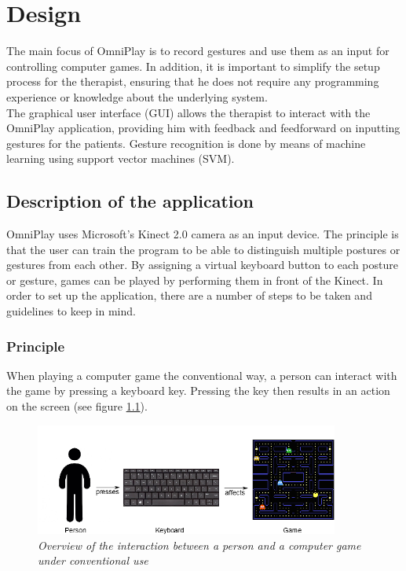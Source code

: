 \chapter{Design}
\label{chapter: design}

The main focus of OmniPlay is to record gestures and use them as an input for controlling computer games. In addition, it is important to simplify the setup process for the therapist, ensuring that he does not require any programming experience or knowledge about the underlying system.\\

The graphical user interface (GUI) allows the therapist to interact with the OmniPlay application, providing him with feedback and feedforward on inputting gestures for the patients. Gesture recognition is done by means of machine learning using support vector machines (SVM).


\section{Description of the application}

OmniPlay uses Microsoft's Kinect 2.0 camera as an input device. The principle is that the user can train the program to be able to distinguish multiple postures or gestures from each other. By assigning a virtual keyboard button to each posture or gesture, games can be played by performing them in front of the Kinect. In order to set up the application, there are a number of steps to be taken and guidelines to keep in mind.


\subsection{Principle}

When playing a computer game the conventional way, a person can interact with the game by pressing a keyboard key. Pressing the key then results in an action on the screen (see figure \ref{fig: overview_basic_interaction}).\\

\begin{figure}[H]
\begin{center}
\includegraphics[width=10cm]{Concept1.png}
\caption{\emph{Overview of the interaction between a person and a computer game under conventional use}}
\label{fig: overview_basic_interaction}
\end{center}
\end{figure}

